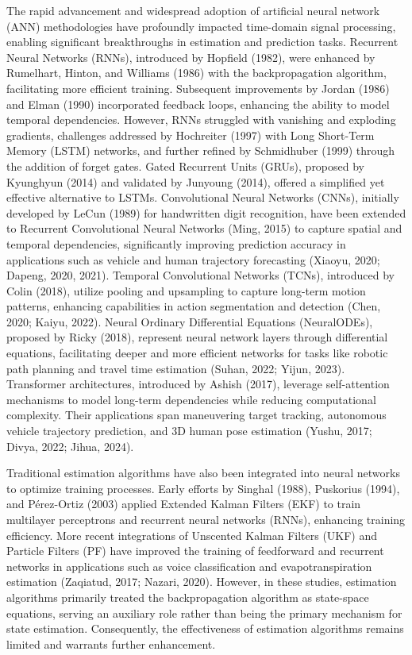 \documentclass[sn-nature]{sn-jnl}%
\theoremstyle{thmstyleone}%
\theoremstyle{thmstyletwo}%
\theoremstyle{thmstylethree}%
\begin{document}
The rapid advancement and widespread adoption of artificial neural network (ANN) methodologies have profoundly impacted time-domain signal processing, enabling significant breakthroughs in estimation and prediction tasks. Recurrent Neural Networks (RNNs), introduced by Hopfield (1982), were enhanced by Rumelhart, Hinton, and Williams (1986) with the backpropagation algorithm, facilitating more efficient training. Subsequent improvements by Jordan (1986) and Elman (1990) incorporated feedback loops, enhancing the ability to model temporal dependencies. However, RNNs struggled with vanishing and exploding gradients, challenges addressed by Hochreiter (1997) with Long Short-Term Memory (LSTM) networks, and further refined by Schmidhuber (1999) through the addition of forget gates. Gated Recurrent Units (GRUs), proposed by Kyunghyun (2014) and validated by Junyoung (2014), offered a simplified yet effective alternative to LSTMs. Convolutional Neural Networks (CNNs), initially developed by LeCun (1989) for handwritten digit recognition, have been extended to Recurrent Convolutional Neural Networks (Ming, 2015) to capture spatial and temporal dependencies, significantly improving prediction accuracy in applications such as vehicle and human trajectory forecasting (Xiaoyu, 2020; Dapeng, 2020, 2021). Temporal Convolutional Networks (TCNs), introduced by Colin (2018), utilize pooling and upsampling to capture long-term motion patterns, enhancing capabilities in action segmentation and detection (Chen, 2020; Kaiyu, 2022). Neural Ordinary Differential Equations (NeuralODEs), proposed by Ricky (2018), represent neural network layers through differential equations, facilitating deeper and more efficient networks for tasks like robotic path planning and travel time estimation (Suhan, 2022; Yijun, 2023). Transformer architectures, introduced by Ashish (2017), leverage self-attention mechanisms to model long-term dependencies while reducing computational complexity. Their applications span maneuvering target tracking, autonomous vehicle trajectory prediction, and 3D human pose estimation (Yushu, 2017; Divya, 2022; Jihua, 2024). 

Traditional estimation algorithms have also been integrated into neural networks to optimize training processes. Early efforts by Singhal (1988), Puskorius (1994), and Pérez-Ortiz (2003) applied Extended Kalman Filters (EKF) to train multilayer perceptrons and recurrent neural networks (RNNs), enhancing training efficiency. More recent integrations of Unscented Kalman Filters (UKF) and Particle Filters (PF) have improved the training of feedforward and recurrent networks in applications such as voice classification and evapotranspiration estimation (Zaqiatud, 2017; Nazari, 2020). However, in these studies, estimation algorithms primarily treated the backpropagation algorithm as state-space equations, serving an auxiliary role rather than being the primary mechanism for state estimation. Consequently, the effectiveness of estimation algorithms remains limited and warrants further enhancement.
\end{document}
